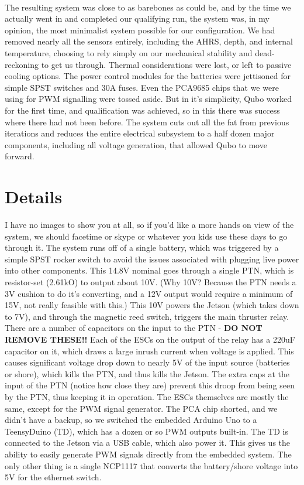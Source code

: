 \documentclass{article}
\begin{document}
\paragraph{}
The resulting system was close to as barebones as could be, and by the time we actually went in and completed our qualifying run, the system was, in my opinion, the most minimalist system possible for our configuration. We had removed nearly all the sensors entirely, including the AHRS, depth, and internal temperature, choosing to rely simply on our mechanical stability and dead-reckoning to get us through. Thermal considerations were lost, or left to passive cooling options. The power control modules for the batteries were jettisoned for simple SPST switches and 30A fuses. Even the PCA9685 chips that we were using for PWM signalling were tossed aside. But in it's simplicity, Qubo worked for the first time, and qualification was achieved, so in this there was success where there had not been before. The system cuts out all the fat from previous iterations and reduces the entire electrical subsystem to a half dozen major components, including all voltage generation, that allowed Qubo to move forward.

\section{Details}
I have no images to show you at all, so if you'd like a more hands on view of the system, we should facetime or skype or whatever you kids use these days to go through it. The system runs off of a single battery, which was triggered by a simple SPST rocker switch to avoid the issues associated with plugging live power into other components. This 14.8V nominal goes through a single PTN, which is resistor-set (2.61kO) to output about 10V. (Why 10V? Because the PTN needs a 3V cushion to do it's converting, and a 12V output would require a minimum of 15V, not really feasible with this.) This 10V powers the Jetson (which takes down to 7V), and through the magnetic reed switch, triggers the main thruster relay. There are a number of capacitors on the input to the PTN - \textbf{DO NOT REMOVE THESE!!} Each of the ESCs on the output of the relay has a 220uF capacitor on it, which draws a large inrush current when voltage is applied. This causes significant voltage drop down to nearly 5V of the input source (batteries or shore), which kills the PTN, and thus kills the Jetson. The extra caps at the input of the PTN (notice how close they are) prevent this droop from being seen by the PTN, thus keeping it in operation. The ESCs themselves are mostly the same, except for the PWM signal generator. The PCA chip shorted, and we didn't have a backup, so we switched the embedded Arduino Uno to a TeensyDuino (TD), which has a dozen or so PWM outputs built-in. The TD is connected to the Jetson via a USB cable, which also power it. This gives us the ability to easily generate PWM signals directly from the embedded system. The only other thing is a single NCP1117 that converts the battery/shore voltage into 5V for the ethernet switch.
\end{document}

